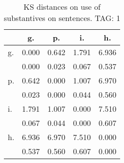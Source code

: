 \begin{table}[h!]
\begin{center}
\begin{tabular}{| l | c | c | c | c |}\hline
 & g. & p. & i. & h. \\\hline
g. & 0.000  & 0.642  & 1.791  & 6.936 \\\hline
 & 0.000  & 0.023  & 0.067  & 0.537 \\\hline
p. & 0.642  & 0.000  & 1.007  & 6.970 \\\hline
 & 0.023  & 0.000  & 0.044  & 0.560 \\\hline
i. & 1.791  & 1.007  & 0.000  & 7.510 \\\hline
 & 0.067  & 0.044  & 0.000  & 0.607 \\\hline
h. & 6.936  & 6.970  & 7.510  & 0.000 \\\hline
 & 0.537  & 0.560  & 0.607  & 0.000 \\\hline
\end{tabular}
\caption{KS distances on use of substantives on sentences. TAG: 1}
\end{center}
\end{table}